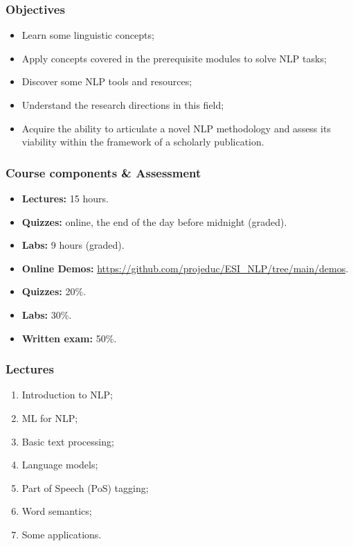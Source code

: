 \documentclass{beamer}
\begin{document}
\begin{frame}
\frametitle{Objectives}

\begin{itemize}
	\item Learn some linguistic concepts;
	\item Apply concepts covered in the prerequisite modules to solve NLP tasks;
	\item Discover some NLP tools and resources;
	\item Understand the research directions in this field;
	\item Acquire the ability to articulate a novel NLP methodology and assess its viability within the framework of a scholarly publication.
\end{itemize}

\end{frame}


\begin{frame}
\frametitle{Course components \& Assessment}

\begin{itemize}
	\item \textbf{Lectures:} 15 hours.
	\item \textbf{Quizzes:} online, the end of the day before midnight (graded).
	\item \textbf{Labs:} 9 hours (graded).
	\item \textbf{Online Demos:} {\scriptsize\url{https://github.com/projeduc/ESI_NLP/tree/main/demos}}.
\end{itemize}

\vfill

\begin{itemize}
	\item \textbf{Quizzes:} 20\%.
	\item \textbf{Labs:} 30\%.
	\item \textbf{Written exam:} 50\%.
\end{itemize}

\end{frame}

\begin{frame}
\frametitle{Lectures}

\begin{enumerate}
	\item Introduction to NLP;
	\item ML for NLP;
	\item Basic text processing;
	\item Language models;
	\item Part of Speech (PoS) tagging;
	\item Word semantics;
	\item Some applications.
\end{enumerate}

\end{frame}
\end{document}
